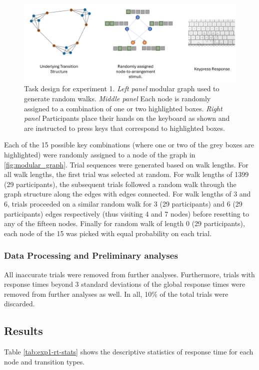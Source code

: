\begin{figure}
	\centering
	\includegraphics[width = \textwidth]{chapter_notebooks/chapter_2/figures/exp1_task_design.png}
	\caption{Task design for experiment 1. \textit{Left panel} modular graph used to generate random walks. \textit{Middle panel} Each node is randomly assigned to a combination of one or two highlighted boxes. \textit{Right panel} Participants place their hands on the keyboard as shown and are instructed to press keys that correspond to highlighted boxes.}
	\label{fig:exp1-design}
\end{figure}

Each of the 15 possible key combinations (where one or two of the grey boxes are highlighted) were randomly assigned to a node of the graph in \ref{fig:modular_graph}. Trial sequences were generated based on walk lengths. For all walk lengths, the first trial was selected at random. For walk lengths of 1399 (29 participants), the subsequent trials followed a random walk through the graph structure along the edges with edges connected. For walk lengths of 3 and 6, trials proceeded on a similar random walk for 3 (29 participants) and 6 (29 participants) edges respectively (thus visiting 4 and 7 nodes) before resetting to any of the fifteen nodes. Finally for random walk of length 0 (29 participants), each node of the 15 was picked with equal probability on each trial. 


\subsubsection*{Data Processing and Preliminary analyses}
All inaccurate trials were removed from further analyses. Furthermore, trials with response times beyond 3 standard deviations of the global response times were removed from further analyses as well. In all, 10\% of the total trials were discarded. 

\subsection{Results}
Table \ref{tab:exp1-rt-stats} shows the descriptive statistics of response time for each node and transition types. 

